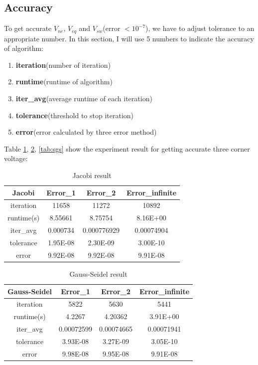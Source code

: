 \documentclass{article}
\begin{document}
\subsection{Accuracy}
To get accurate $V_{ne}$, $V_{eq}$ and $V_{sw}$(error $< 10^{-7}$), we have to adjust tolerance to an appropriate number. In this 
section, I will use 5 numbers to indicate the accuracy of algorithm:
\begin{enumerate}
	\item \textbf{iteration}(number of iteration)
	\item \textbf{runtime}(runtime of algorithm)
	\item \textbf{iter\_avg}(average runtime of each iteration)
    \item \textbf{tolerance}(threshold to stop iteration)
    \item \textbf{error}(error calculated by three error method)
\end{enumerate}
Table \ref{tab:jacobi}, \ref{tab:gauss}, \ref{tab:sgs} show the experiment result for getting accurate three corner voltage:
\begin{table}[H]
  \centering
    \begin{tabular}{|c|c|c|c|}
    \hline
    \textbf{Jacobi} & Error\_1 & Error\_2 & Error\_infinite \bigstrut\\
    \hline
    iteration & 11658 & 11272 & 10892 \bigstrut\\
    \hline
    runtime(s) & 8.55661 & 8.75754 & 8.16E+00 \bigstrut\\
    \hline
    iter\_avg  & 0.000734 & 0.000776929 & 0.00074904 \bigstrut\\
    \hline
    tolerance & 1.95E-08 & 2.30E-09 & 3.00E-10 \bigstrut\\
    \hline
    error & 9.92E-08 & 9.92E-08 & 9.91E-08 \bigstrut\\
    \hline
    \end{tabular}%
  \caption{Jacobi result}
  \label{tab:jacobi}%
\end{table}%
\begin{table}[H]
  \centering
    \begin{tabular}{|c|c|c|c|}
    \hline
    \textbf{Gauss-Seidel} & Error\_1 & Error\_2 & Error\_infinite \bigstrut\\
    \hline
    iteration & 5822 & 5630 & 5441 \bigstrut\\
    \hline
    runtime(s) & 4.2267 & 4.20362 & 3.91E+00 \bigstrut\\
    \hline
    iter\_avg & 0.00072599 & 0.00074665 & 0.00071941 \bigstrut\\
    \hline
    tolerance & 3.93E-08 & 3.27E-09 & 3.05E-10 \bigstrut\\
    \hline
    error & 9.98E-08 & 9.95E-08 & 9.91E-08 \bigstrut\\
    \hline
    \end{tabular}%
  \caption{Gauss-Seidel result}
  \label{tab:gauss}%
\end{table}%
\end{document}
